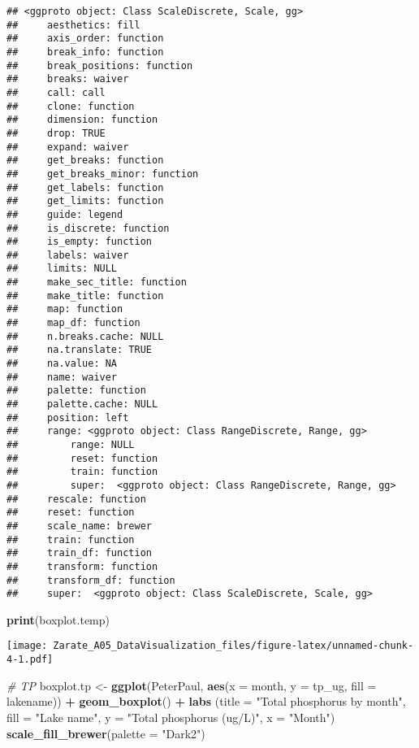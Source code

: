 \documentclass[
]{article}
\newenvironment{Shaded}{\begin{snugshade}}{\end{snugshade}}
\newcommand{\CommentTok}[1]{\textcolor[rgb]{0.56,0.35,0.01}{\textit{#1}}}
\newcommand{\DataTypeTok}[1]{\textcolor[rgb]{0.13,0.29,0.53}{#1}}
\newcommand{\KeywordTok}[1]{\textcolor[rgb]{0.13,0.29,0.53}{\textbf{#1}}}
\newcommand{\NormalTok}[1]{#1}
\newcommand{\OperatorTok}[1]{\textcolor[rgb]{0.81,0.36,0.00}{\textbf{#1}}}
\newcommand{\StringTok}[1]{\textcolor[rgb]{0.31,0.60,0.02}{#1}}
\begin{document}
\begin{verbatim}
## <ggproto object: Class ScaleDiscrete, Scale, gg>
##     aesthetics: fill
##     axis_order: function
##     break_info: function
##     break_positions: function
##     breaks: waiver
##     call: call
##     clone: function
##     dimension: function
##     drop: TRUE
##     expand: waiver
##     get_breaks: function
##     get_breaks_minor: function
##     get_labels: function
##     get_limits: function
##     guide: legend
##     is_discrete: function
##     is_empty: function
##     labels: waiver
##     limits: NULL
##     make_sec_title: function
##     make_title: function
##     map: function
##     map_df: function
##     n.breaks.cache: NULL
##     na.translate: TRUE
##     na.value: NA
##     name: waiver
##     palette: function
##     palette.cache: NULL
##     position: left
##     range: <ggproto object: Class RangeDiscrete, Range, gg>
##         range: NULL
##         reset: function
##         train: function
##         super:  <ggproto object: Class RangeDiscrete, Range, gg>
##     rescale: function
##     reset: function
##     scale_name: brewer
##     train: function
##     train_df: function
##     transform: function
##     transform_df: function
##     super:  <ggproto object: Class ScaleDiscrete, Scale, gg>
\end{verbatim}

\begin{Shaded}
\begin{Highlighting}[]
\KeywordTok{print}\NormalTok{(boxplot.temp) }
\end{Highlighting}
\end{Shaded}

\texttt{[image: Zarate\_A05\_DataVisualization\_files/figure-latex/unnamed-chunk-4-1.pdf]}

\begin{Shaded}
\begin{Highlighting}[]
\CommentTok{# TP}
\NormalTok{boxplot.tp <-}\StringTok{ }\KeywordTok{ggplot}\NormalTok{(PeterPaul, }\KeywordTok{aes}\NormalTok{(}\DataTypeTok{x =}\NormalTok{ month, }\DataTypeTok{y =}\NormalTok{ tp_ug, }\DataTypeTok{fill =}\NormalTok{ lakename)) }\OperatorTok{+}
\StringTok{  }\KeywordTok{geom_boxplot}\NormalTok{() }\OperatorTok{+}
\StringTok{  }\KeywordTok{labs}\NormalTok{ (}\DataTypeTok{title =} \StringTok{"Total phosphorus by month"}\NormalTok{, }\DataTypeTok{fill =} \StringTok{"Lake name"}\NormalTok{,}
        \DataTypeTok{y =} \StringTok{"Total phosphorus (ug/L)"}\NormalTok{, }\DataTypeTok{x =} \StringTok{"Month"}\NormalTok{)}
  \KeywordTok{scale_fill_brewer}\NormalTok{(}\DataTypeTok{palette =} \StringTok{"Dark2"}\NormalTok{) }
\end{Highlighting}
\end{Shaded}
\end{document}
